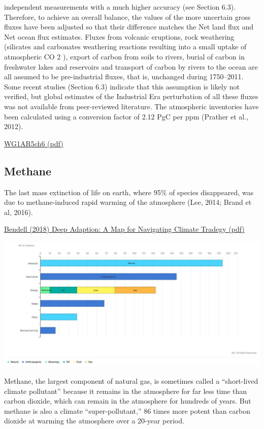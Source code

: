 \documentclass[
]{book}
\begin{document}
{independent measurements with a much higher accuracy (see Section 6.3). Therefore, to achieve an overall balance, the values of the more uncertain gross fluxes have been adjusted
so that their difference matches the Net land flux and Net ocean flux estimates. Fluxes from volcanic eruptions, rock weathering (silicates and carbonates weathering reactions
resulting into a small uptake of atmospheric CO 2 ), export of carbon from soils to rivers, burial of carbon in freshwater lakes and reservoirs and transport of carbon by rivers to the
ocean are all assumed to be pre-industrial fluxes, that is, unchanged during 1750--2011. Some recent studies (Section 6.3) indicate that this assumption is likely not verified, but
global estimates of the Industrial Era perturbation of all these fluxes was not available from peer-reviewed literature. The atmospheric inventories have been calculated using a
conversion factor of 2.12 PgC per ppm (Prather et al., 2012).}

\href{pdf/WG1AR5_Chapter06_FINAL.pdf}{WG1AR5ch6 (pdf)}

\hypertarget{methane}{%
\subsection{Methane}\label{methane}}

The last mass extinction of life on earth, where 95\% of species disappeared,
was due to methane-induced rapid warming of the atmosphere (Lee, 2014; Brand et al, 2016).

\href{pdf/\%20Bendell_2020_Deep_Adaptation.pdf}{Bendell (2018) Deep Adaption: A Map for Navigating Climate Tradegy (pdf)}

\includegraphics{fig/Methane_by_Source.jpeg}

Methane, the largest component of natural gas, is sometimes called a ``short-lived climate pollutant'' because it remains in the atmosphere for far less time than carbon dioxide, which can remain in the atmosphere for hundreds of years. But methane is also a climate ``super-pollutant,'' 86 times more potent than carbon dioxide at warming the atmosphere over a 20-year period.
\end{document}
